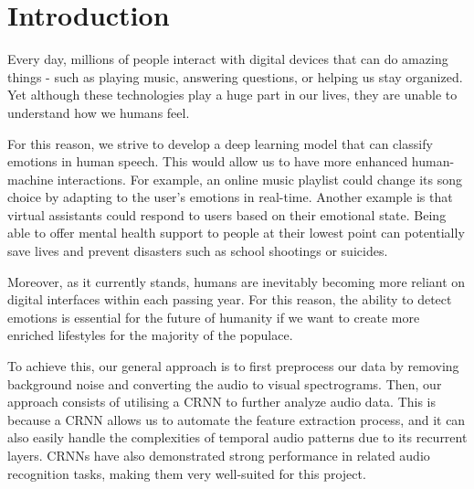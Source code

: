 \documentclass[../main.tex]{subfiles}
\begin{document}
\section{Introduction}
Every day, millions of people interact with digital devices that can do amazing 
things - such as playing music, answering questions, or helping us stay organized. 
Yet although these technologies play a huge part in our lives, they are unable to 
understand how we humans feel. 

For this reason, we strive to develop a deep learning model that can classify 
emotions in human speech. This would allow us to have more enhanced 
human-machine interactions. For example, an online music playlist could 
change its song choice by adapting to the user's emotions in real-time. Another 
example is that virtual assistants could respond to users based on their 
emotional state. Being able to offer mental health support to people at their 
lowest point can potentially save lives and prevent disasters such as school 
shootings or suicides.

Moreover, as it currently stands, humans are inevitably becoming more reliant on 
digital interfaces within each passing year. For this reason, the ability to
detect emotions is essential for the future of humanity if we want to create
more enriched lifestyles for the majority of the populace.

To achieve this, our general approach is to first preprocess our data by removing
background noise and converting the audio to visual spectrograms. Then, our approach
consists of utilising a CRNN to further analyze audio data. This is because a CRNN
allows us to automate the feature extraction process, and it can also easily handle
the complexities of temporal audio patterns due to its recurrent layers. CRNNs have
also demonstrated strong performance in related audio recognition tasks, making them
very well-suited for this project.
\end{document}
